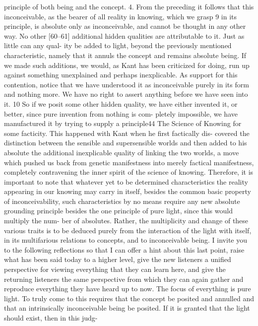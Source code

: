 principle of both being and the concept.
4. From the preceding it follows that this inconceivable, as the bearer of all
reality in knowing, which we grasp 9 in its principle, is absolute only as
inconceivable, and cannot be thought in any other way. No other [60–61]
additional hidden qualities are attributable to it. Just as little can any qual-
ity be added to light, beyond the previously mentioned characteristic,
namely that it annuls the concept and remains absolute being. If we made
such additions, we would, as Kant has been criticized for doing, run up
against something unexplained and perhaps inexplicable. As support for
this contention, notice that we have understood it as inconceivable purely
in its form and nothing more. We have no right to assert anything before
we have seen into it. 10 So if we posit some other hidden quality, we have
either invented it, or better, since pure invention from nothing is com-
pletely impossible, we have manufactured it by trying to supply a principle44
The Science of Knowing
for some facticity. This happened with Kant when he first factically dis-
covered the distinction between the sensible and supersensible worlds and
then added to his absolute the additional inexplicable quality of linking the
two worlds, a move which pushed us back from genetic manifestness into
merely factical manifestness, completely contravening the inner spirit of
the science of knowing. Therefore, it is important to note that whatever yet
to be determined characteristics the reality appearing in our knowing may
carry in itself, besides the common basic property of inconceivability, such
characteristics by no means require any new absolute grounding principle
besides the one principle of pure light, since this would multiply the num-
ber of absolutes. Rather, the multiplicity and change of these various traits
is to be deduced purely from the interaction of the light with itself, in its
multifarious relations to concepts, and to inconceivable being.
I invite you to the following reflections so that I can offer a hint about
this last point, raise what has been said today to a higher level, give the new
listeners a unified perspective for viewing everything that they can learn here,
and give the returning listeners the same perspective from which they can
again gather and reproduce everything they have heard up to now.
The focus of everything is pure light. To truly come to this requires that
the concept be posited and annulled and that an intrinsically inconceivable
being be posited. If it is granted that the light should exist, then in this judg-
